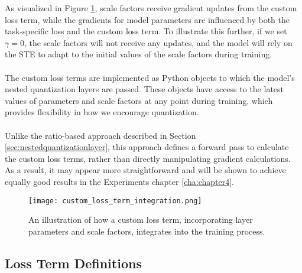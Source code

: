 \noindent As visualized in Figure \ref{fig:custom_loss_term_integration}, 
scale factors receive gradient updates from the custom loss term,
while the gradients for model parameters are influenced by both the task-specific loss
and the custom loss term. To illustrate this further,
if we set \( \gamma = 0 \), the scale factors will not receive any updates,
and the model will rely on the STE to adapt to the initial values of the scale factors during training.
\\
\\
The custom loss terms are implemented as Python objects
to which the model's nested quantization layers are passed.
These objects have access to the latest values of parameters
and scale factors at any point during training,
which provides flexibility in how we encourage quantization.
\\
\\
Unlike the ratio-based approach described in Section \ref{sec:nestedquantizationlayer},
this approach defines a forward pass to calculate the custom loss terms,
rather than directly manipulating gradient calculations.
As a result, it may appear more straightforward
and will be shown to achieve equally good results in the Experiments chapter \ref{cha:chapter4}.


\begin{figure}[h!]
  \centering
  \texttt{[image: custom\_loss\_term\_integration.png]}
  \caption{An illustration of how a custom loss term, incorporating layer parameters and scale factors, integrates into the training process.}
  \label{fig:custom_loss_term_integration}
\end{figure}


\subsection{Loss Term Definitions}
\label{subsec:losstermdefinitions}